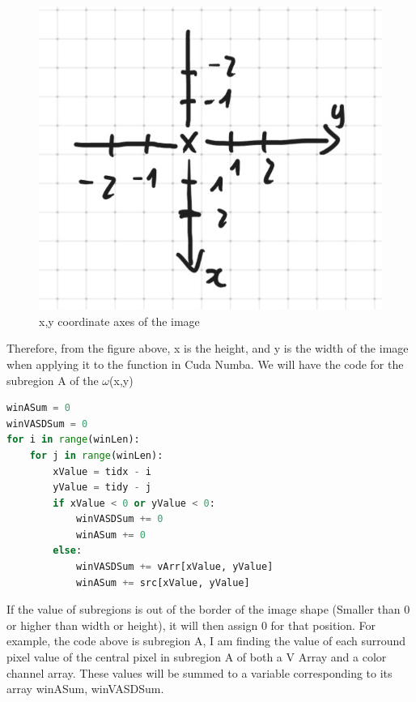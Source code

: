 \documentclass{article}
\begin{document}
\begin{figure}
    \centering
    \includegraphics[scale=0.5]{images/newXY.jpg}
    \caption{x,y coordinate axes of the image}
    \label{fig:figure4}
\end{figure}

\pagebreak

Therefore, from the figure above, x is the height, and y is the width of the image when applying it to the function in Cuda Numba. We will have the code for the subregion A of the $\omega$(x,y)

\begin{lstlisting}[language=Python]
winASum = 0
winVASDSum = 0
for i in range(winLen):
    for j in range(winLen):
        xValue = tidx - i
        yValue = tidy - j
        if xValue < 0 or yValue < 0:
            winVASDSum += 0
            winASum += 0
        else:
            winVASDSum += vArr[xValue, yValue]
            winASum += src[xValue, yValue]
\end{lstlisting}

If the value of subregions is out of the border of the image shape (Smaller than 0 or higher than width or height), it will then assign 0 for that position. For example, the code above is subregion A, I am finding the value of each surround pixel value of the central pixel in subregion A of both a V Array and a color channel array. These values will be summed to a variable corresponding to its array winASum, winVASDSum.
\end{document}
